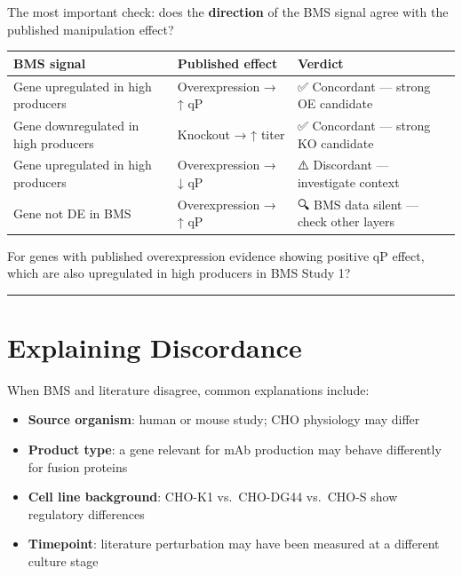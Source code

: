 \documentclass[
  letterpaper,
  oneside,
  open=any]{scrbook}
\newcounter{none} %
\providecommand{\tightlist}{%
  \setlength{\itemsep}{0pt}\setlength{\parskip}{0pt}}
\begin{document}
The most important check: does the \textbf{direction} of the BMS signal
agree with the published manipulation effect?

{\def\LTcaptype{none} %
\begin{longtable}[]{@{}
  >{\raggedright\arraybackslash}p{}
  >{\raggedright\arraybackslash}p{}
  >{\raggedright\arraybackslash}p{}@{}}
\toprule\noalign{}
\begin{minipage}[b]{\linewidth}\raggedright
BMS signal
\end{minipage} & \begin{minipage}[b]{\linewidth}\raggedright
Published effect
\end{minipage} & \begin{minipage}[b]{\linewidth}\raggedright
Verdict
\end{minipage} \\
\midrule\noalign{}
\endhead
\bottomrule\noalign{}
\endlastfoot
Gene upregulated in high producers & Overexpression → ↑ qP & ✅
Concordant --- strong OE candidate \\
Gene downregulated in high producers & Knockout → ↑ titer & ✅
Concordant --- strong KO candidate \\
Gene upregulated in high producers & Overexpression → ↓ qP & ⚠️
Discordant --- investigate context \\
Gene not DE in BMS & Overexpression → ↑ qP & 🔍 BMS data silent ---
check other layers \\
\end{longtable}
}

For genes with published overexpression evidence showing positive qP
effect, which are also upregulated in high producers in BMS Study 1?

\begin{center}\rule{0.5\linewidth}{0.5pt}\end{center}

\section{Explaining Discordance}\label{explaining-discordance}

When BMS and literature disagree, common explanations include:

\begin{itemize}
\tightlist
\item
  \textbf{Source organism}: human or mouse study; CHO physiology may
  differ
\item
  \textbf{Product type}: a gene relevant for mAb production may behave
  differently for fusion proteins
\item
  \textbf{Cell line background}: CHO-K1 vs.~CHO-DG44 vs.~CHO-S show
  regulatory differences
\item
  \textbf{Timepoint}: literature perturbation may have been measured at
  a different culture stage
\end{itemize}
\end{document}
